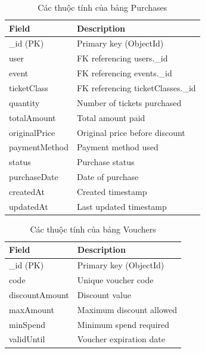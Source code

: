 \begin{table}[H]
\centering
\begin{tabular}{|p{4.5cm}|p{6cm}|}
\hline
\textbf{Field} & \textbf{Description} \\ \hline
\_id (PK) & Primary key (ObjectId) \\ \hline
user & FK referencing users.\_id \\ \hline
event & FK referencing events.\_id \\ \hline
ticketClass & FK referencing ticketClasses.\_id \\ \hline
quantity & Number of tickets purchased \\ \hline
totalAmount & Total amount paid \\ \hline
originalPrice & Original price before discount \\ \hline
paymentMethod & Payment method used \\ \hline
status & Purchase status \\ \hline
purchaseDate & Date of purchase \\ \hline
createdAt & Created timestamp \\ \hline
updatedAt & Last updated timestamp \\ \hline
\end{tabular}
\vspace{15pt}
\caption{Các thuộc tính của bảng Purchases}
\end{table}

\begin{table}[H]
\centering
\begin{tabular}{|p{4.5cm}|p{6cm}|}
\hline
\textbf{Field} & \textbf{Description} \\ \hline
\_id (PK) & Primary key (ObjectId) \\ \hline
code & Unique voucher code \\ \hline
discountAmount & Discount value \\ \hline
maxAmount & Maximum discount allowed \\ \hline
minSpend & Minimum spend required \\ \hline
validUntil & Voucher expiration date \\ \hline
\end{tabular}
\vspace{15pt}
\caption{Các thuộc tính của bảng Vouchers}
\end{table}

